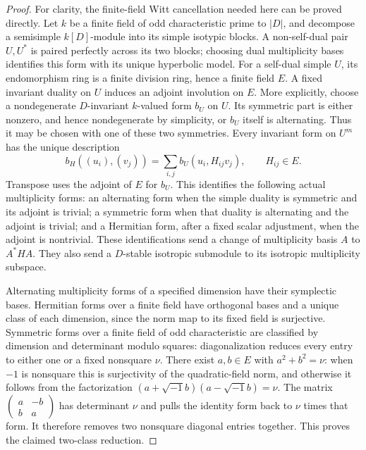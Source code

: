 \begin{proof}
For clarity, the finite-field Witt cancellation
needed here can be proved directly.
Let \(k\) be a finite field of odd characteristic
prime to \(|D|\), and decompose a semisimple
\(k[D]\)-module into its simple isotypic blocks.
A non-self-dual pair \(U,U^*\) is paired perfectly
across its two blocks; choosing dual multiplicity
bases identifies this form with its unique
hyperbolic model.
For a self-dual simple \(U\), its endomorphism ring
is a finite division ring, hence a finite field
\(E\).  A fixed invariant duality on \(U\) induces
an adjoint involution on \(E\).
More explicitly, choose a nondegenerate
\(D\)-invariant \(k\)-valued form \(b_U\) on \(U\).
Its symmetric part is either nonzero, and hence
nondegenerate by simplicity, or \(b_U\) itself
is alternating.
Thus it may be chosen with one of these two
symmetries.
Every invariant form on \(U^m\) has the unique
description
\[
 b_H((u_i),(v_j))=
             \sum_{i,j}b_U(u_i,H_{ij}v_j),
                    \qquad H_{ij}\in E .
\]
Transpose uses the adjoint of \(E\) for \(b_U\).
This identifies the following actual
multiplicity forms:
an alternating form when the simple duality is
symmetric and its adjoint is trivial; a symmetric
form when that duality is alternating and the
adjoint is trivial; and a Hermitian form, after
a fixed scalar adjustment, when the adjoint
is nontrivial.
These identifications send a change of multiplicity
basis \(A\) to \(A^*HA\).
They also send a \(D\)-stable isotropic submodule
to its isotropic multiplicity subspace.

Alternating multiplicity forms of a specified
dimension have their symplectic bases.
Hermitian forms over a finite field have
orthogonal bases and a unique class of each
dimension, since the norm map to its fixed
field is surjective.
Symmetric forms over a finite field of odd
characteristic are classified by dimension
and determinant modulo squares:
diagonalization reduces every entry to either
one or a fixed nonsquare \(\nu\).
There exist \(a,b\in E\) with \(a^2+b^2=\nu\):
when \(-1\) is nonsquare this is surjectivity
of the quadratic-field norm, and otherwise
it follows from the factorization
\((a+\sqrt{-1}b)(a-\sqrt{-1}b)=\nu\).
The matrix
\(\left(\begin{smallmatrix}a&-b\\b&a\end{smallmatrix}\right)\)
has determinant \(\nu\) and pulls the identity
form back to \(\nu\) times that form.
It therefore removes two nonsquare diagonal
entries together.
This proves the claimed two-class reduction.


\end{proof}
